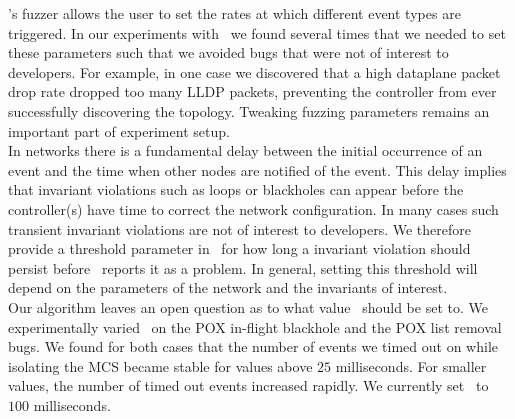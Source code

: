  \projectname's fuzzer allows the
user to set the rates at which different event types are triggered. In our experiments with
\projectname~we found several times that we needed to set these parameters
such that we avoided bugs that were not of interest to developers.
For example, in one case we discovered that a high dataplane
packet drop rate dropped too many LLDP packets, preventing the controller from ever successfully discovering the topology.
Tweaking fuzzing parameters remains an important
part of experiment setup.\\[0.5ex]
%
 In
networks there is a fundamental delay between the initial occurrence of an
event and the time when other nodes are notified of the event. This delay implies
that invariant violations such as loops or blackholes can appear
before the controller(s) have time to correct the network configuration. In
many cases such transient invariant violations are not of interest to
developers. We therefore provide a threshold parameter in \projectname~for
how long a invariant violation should persist before
\projectname~reports it as a problem. In general, setting this
threshold will depend on the parameters of the network and the invariants of
interest.\\[0.5ex]
%
 Our algorithm leaves an open question as to what value
\textepsilon~should be set to. We experimentally varied \textepsilon~on the
POX in-flight blackhole and the POX list removal bugs.
We found for both cases that the number of events we timed out on while isolating the MCS became stable for values above $25$ milliseconds.
For smaller values, the number of timed out events increased rapidly. We
currently set \textepsilon~to $100$ milliseconds.



